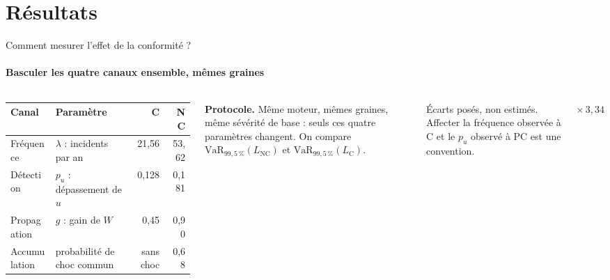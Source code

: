 \documentclass[aspectratio=169,10pt,t]{beamer}
\newcommand{\VaR}{\mathrm{VaR}}
\renewcommand{\arraystretch}{1.25}
\begin{document}
\section{Résultats}
\begin{frame}{Comment mesurer l'effet de la conformité ?}
  \framesubtitle{\ajout Basculer les quatre canaux ensemble, mêmes graines}
  \begin{columns}[T,onlytextwidth]
    \footnotesize
    \renewcommand{\arraystretch}{1.3}
    \begin{tabularx}{\linewidth}{@{}l Y r r@{}}
      \toprule
      \textbf{Canal} & \textbf{Paramètre} & \textbf{C} & \textcolor{accent}{\textbf{NC}} \\
      \midrule
      Fréquence & $\lambda$ : incidents par an & 21,56 & \textcolor{accent}{53,62} \\
      Détection & $p_u$ : dépassement de $u$ & 0,128 & \textcolor{accent}{0,181} \\
      Propagation & $g$ : gain de $W$ & 0,45 & \textcolor{accent}{0,90} \\
      Accumulation & probabilité de choc commun & sans choc & \textcolor{accent}{0,68} \\
      \bottomrule
    \end{tabularx}\par\vspace{2mm}
    \textbf{Protocole.} Même moteur, mêmes graines, même sévérité de base : seuls ces quatre paramètres changent.
    On compare $\VaR_{99{,}5\,\%}(L_{\mathrm{NC}})$ et $\VaR_{99{,}5\,\%}(L_{\mathrm{C}})$.\par\vspace{1mm}
    {\scriptsize\color{gris}Écarts posés, non estimés. Affecter la fréquence observée à C et le $p_u$ observé à PC est une convention.}
    \centering
    \par\vspace{1mm}
    {\editorial\fontsize{18}{19}\selectfont\color{accent}$\times\,3{,}34$}\par\vspace{.5mm}

\end{columns}
\end{frame}
\end{document}

